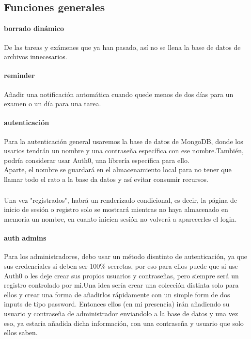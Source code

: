 \documentclass[a4paper]{article}
\begin{document}
\subsection[Generales]{Funciones generales}
\paragraph{borrado dinámico}
De las tareas y exámenes que ya han pasado, así no se llena la base de datos de 
archivos innecesarios.

\paragraph{reminder}
Añadir una notificación automática cuando quede menos de dos días para un examen o un día para
una tarea.

\paragraph{autenticación}
Para la autenticación general usaremos la base de datos de MongoDB, donde los usarios tendrán un nombre 
y una contraseña específica con ese nombre.También, podría considerar usar Auth0, una librería específica
para ello.\\ Aparte, el nombre se guardará en el almacenamiento local para no tener que llamar todo el rato
a la base da datos y así evitar consumir recursos.
\subparagraph{}
Una vez "registrados", habrá un renderizado condicional, es decir, la página de inicio de sesión o registro 
solo se mostrará mientras no haya almacenado en memoria un nombre, en cuanto inicien sesión no volverá a 
aparecerles el login.

\paragraph{auth admins}
Para los administradores, debo usar un método disntinto de autenticación, ya que sus credenciales si 
deben ser 100\% secretas, por eso para ellos puede que si use Auth0 o les deje crear sus propios usuarios 
y contraseñas, pero siempre será un registro controlado por mi.Una idea sería crear una colección distinta
solo para ellos y crear una forma de añadirlos rápidamente con un simple form de dos inputs de tipo password. 
Entonces ellos (en mi presencia) irán añadiendo su usuario y contraseña de administrador enviandolo a la base 
de datos y una vez eso, ya estaría añadida dicha información, con una contraseña 
y usuario que solo ellos saben. 
\end{document}
